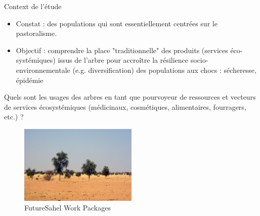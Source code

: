 \documentclass[newPxFont]{beamer}
\begin{document}
\begin{frame}[c]{Context de l'étude}
\vspace{-1cm}
\begin{itemize}
  \item Constat : des populations qui sont essentiellement centrées sur le pastoralisme.
  \item Objectif : comprendre la place "traditionnelle" des produits (services éco-systémiques) issus de l'arbre pour accroître la résilience socio-environnementale (e.g. diversification) des populations aux chocs : sécheresse, épidémie
\end{itemize}

Quels sont les usages des arbres en tant que pourvoyeur de ressources et vecteurs de services écosystémiques (médicinaux, cosmétiques, alimentaires, fourragers, etc.) ?

\begin{figure}
	\centering
	\includegraphics[width = 0.5\textwidth]{img/2007_Podor.JPG}
	\caption{FutureSahel Work Packages}
\end{figure}
\end{frame}
\end{document}
